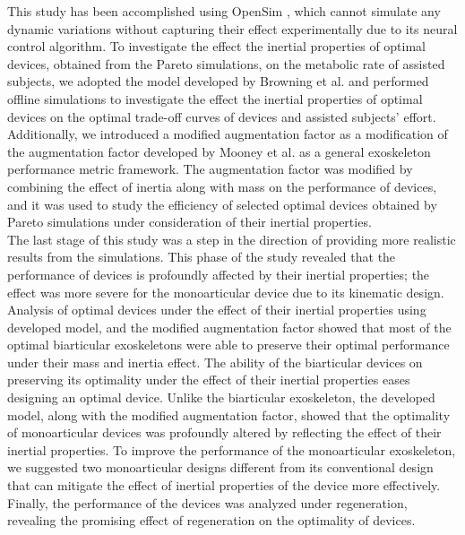 \documentclass[10pt,letterpaper]{article}
\begin{document}
This study has been accomplished using OpenSim \cite{89}, which cannot simulate any dynamic variations without capturing their effect experimentally due to its neural control algorithm\cite{92}. To investigate the effect the inertial properties of optimal devices, obtained from the Pareto simulations, on the metabolic rate of assisted subjects, we adopted the model developed by Browning et al. \cite{45} and performed offline simulations to investigate the effect the inertial properties of optimal devices on the optimal trade-off curves of devices and assisted subjects' effort.
Additionally, we introduced a modified augmentation factor as a modification of the augmentation factor developed by Mooney et al. \cite{41} as a general exoskeleton performance metric framework. The augmentation factor was modified by combining the effect of inertia along with mass on the performance of devices, and it was used to study the efficiency of selected optimal devices obtained by Pareto simulations under consideration of their inertial properties.\\
The last stage of this study was a step in the direction of providing more realistic results from the simulations. This phase of the study revealed that the performance of devices is profoundly affected by their inertial properties; the effect was more severe for the monoarticular device due to its kinematic design. Analysis of optimal devices under the effect of their inertial properties using developed model, and the modified augmentation factor showed that most of the optimal biarticular exoskeletons were able to preserve their optimal performance under their mass and inertia effect. The ability of the biarticular devices on preserving its optimality under the effect of their inertial properties eases designing an optimal device. Unlike the biarticular exoskeleton, the developed model, along with the modified augmentation factor, showed that the optimality of monoarticular devices was profoundly altered by reflecting the effect of their inertial properties. To improve the performance of the monoarticular exoskeleton, we suggested two monoarticular designs different from its conventional design that can mitigate the effect of inertial properties of the device more effectively. Finally, the performance of the devices was analyzed under regeneration, revealing the promising effect of regeneration on the optimality of devices.\\
\end{document}
